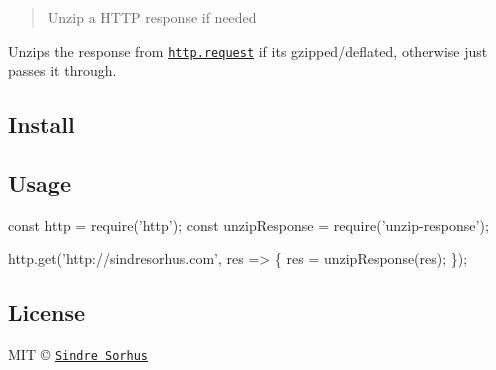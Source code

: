 \begin{quote}
Unzip a H\+T\+TP response if needed \end{quote}


Unzips the response from \href{https://nodejs.org/api/http.html#http_http_request_options_callback}{\tt {\ttfamily http.\+request}} if it\textquotesingle{}s gzipped/deflated, otherwise just passes it through.

\subsection*{Install}




\subsection*{Usage}


\begin{DoxyCode}
const http = require('http');
const unzipResponse = require('unzip-response');

http.get('http://sindresorhus.com', res => \{
  res = unzipResponse(res);
\});
\end{DoxyCode}


\subsection*{License}

M\+IT © \href{https://sindresorhus.com}{\tt Sindre Sorhus} 